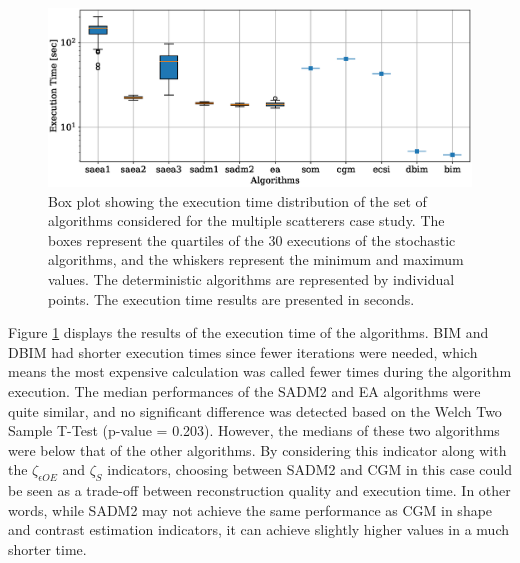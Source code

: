 			\begin{figure}
				\centering
				\includegraphics[width=.9\textwidth]{./figuras/casestudy/multiple/boxplot_time}
				\caption[Box plot showing the execution time distribution of the set of algorithms considered for the multiple scatterers case study.]{Box plot showing the execution time distribution of the set of algorithms considered for the multiple scatterers case study. The boxes represent the quartiles of the 30 executions of the stochastic algorithms, and the whiskers represent the minimum and maximum values. The deterministic algorithms are represented by individual points. The execution time results are presented in seconds.}
				\label{fig:results:casestudy:multiple:boxplot:time}
			\end{figure}
		
			
			Figure \ref{fig:results:casestudy:multiple:boxplot:time} displays the results of the execution time of the algorithms. BIM and DBIM had shorter execution times since fewer iterations were needed, which means the most expensive calculation was called fewer times during the algorithm execution. The median performances of the SADM2 and EA algorithms were quite similar, and no significant difference was detected based on the Welch Two Sample T-Test (p-value = 0.203). However, the medians of these two algorithms were below that of the other algorithms. By considering this indicator along with the $\zeta_{\epsilon OE}$ and $\zeta_S$ indicators, choosing between SADM2 and CGM in this case could be seen as a trade-off between reconstruction quality and execution time. In other words, while SADM2 may not achieve the same performance as CGM in shape and contrast estimation indicators, it can achieve slightly higher values in a much shorter time.
		
